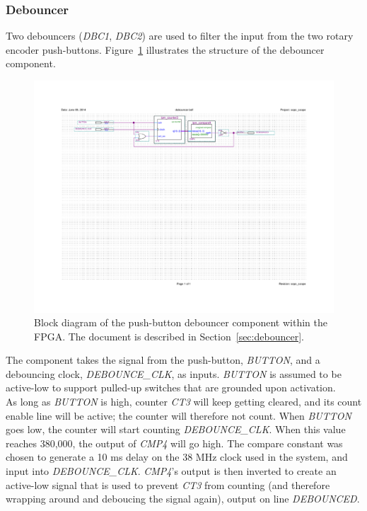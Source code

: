 \documentclass[titlepage]{scrartcl}
\begin{document}
	\clearpage

	\subsubsection{Debouncer \label{sec:debouncer}}
	Two debouncers (\textit{DBC1}, \textit{DBC2}) are used to filter the input from the two rotary encoder push-buttons. Figure~\ref{fig:debouncer_bdf} illustrates the structure of the debouncer component.\\

	\begin{figure}[h!]
	\vspace{-4cm}
	\centerline{\includegraphics[width=30cm, angle=90, origin=c]{img/debouncer.pdf}}
		\vspace{-2cm}
                	\caption{Block diagram of the push-button debouncer component within the FPGA. The document is described in Section~\ref{sec:debouncer}.}
               	\label{fig:debouncer_bdf}
	\end{figure}

	The component takes the signal from the push-button, \textit{BUTTON}, and a debouncing clock, \textit{DEBOUNCE\_CLK}, as inputs. \textit{BUTTON} is assumed to be active-low to support pulled-up switches that are grounded upon activation.\\

	As long as \textit{BUTTON} is high, counter \textit{CT3} will keep getting cleared, and its count enable line will be active; the counter will therefore not count. When \textit{BUTTON} goes low, the counter will start counting \textit{DEBOUNCE\_CLK}. When this value reaches 380,000, the output of \textit{CMP4} will go high. The compare constant was chosen to generate a 10 ms delay on the 38 MHz clock used in the system, and input into \textit{DEBOUNCE\_CLK}. \textit{CMP4}'s output is then inverted to create an active-low signal that is used to prevent \textit{CT3} from counting (and therefore wrapping around and deboucing the signal again), output on line \textit{DEBOUNCED}.
\end{document}
